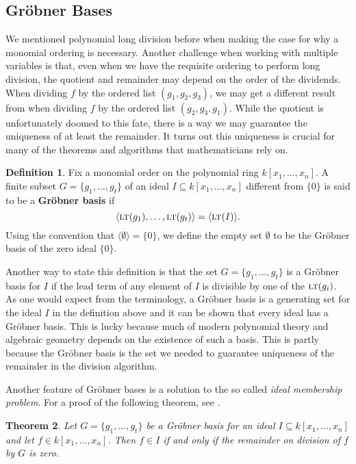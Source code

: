 \documentclass[MS, xcolor=dvipsnames]{wfuthesis}
\def\sbs{\subseteq}
\newcommand{\LT}{\ensuremath{\text{\sc lt}}}
\newtheorem{theorem}{Theorem}
\theoremstyle{definition}
\newtheorem{definition}[theorem]{Definition}
\begin{document}
\subsection{Gr\"obner Bases}
We mentioned polynomial long division before when making the case for why a monomial ordering is necessary. Another challenge when working with multiple variables is that, even when we have the requisite ordering to perform long division, the quotient and remainder may depend on the order of the dividends. When dividing $f$ by the ordered list $(g_1,g_2,g_3)$, we may get a different result from when dividing $f$ by the ordered list $(g_2,g_3,g_1)$. While the quotient is unfortunately doomed to this fate, there is a way we may guarantee the uniqueness of at least the remainder. It turns out this uniqueness is crucial for many of the theorems and algorithms that mathematicians rely on. \par
\begin{definition}
  Fix a monomial order on the polynomial ring $k[x_1,\dots,x_n]$. A finite subset $G = \{ g_1,\dots,g_t \}$ of an ideal $I \sbs k[x_1,\dots,x_n]$ different from $\{0\}$ is said to be a \textbf{Gr\"obner basis} if
  \[ \langle \LT(g_1), \dots, \LT(g_t) \rangle = \langle \LT(I) \rangle. \]
  Using the convention that $\langle \emptyset \rangle = \{0\}$, we define the empty set $\emptyset$ to be the Gr\"obner basis of the zero ideal $\{0\}$.
\end{definition}
Another way to state this definition is that the set $G = \{ g_1,\dots,g_t \}$ is a Gr\"obner basis for $I$ if the lead term of any element of $I$ is divisible by one of the $\LT(g_i)$. As one would expect from the terminology, a Gr\"obner basis is a generating set for the ideal $I$ in the definition above and it can be shown that every ideal has a Gr\"obner basis. This is lucky because much of modern polynomial theory and algebraic geometry depends on the existence of such a basis. This is partly because the Gr\"obner basis is the set we needed to guarantee uniqueness of the remainder in the division algorithm. \par
Another feature of Gr\"obner bases is a solution to the so called \emph{ideal membership problem}. For a proof of the following theorem, see \cite{Cox2015}.
\begin{theorem}
  Let $G = \{ g_1,\dots,g_t \}$ be a Gr\"obner basis for an ideal $I \sbs k[x_1,\dots,x_n]$ and let $f \in k[x_1,\dots,x_n]$. Then $f \in I$ if and only if the remainder on division of $f$ by $G$ is zero.
\end{theorem}
\end{document}
